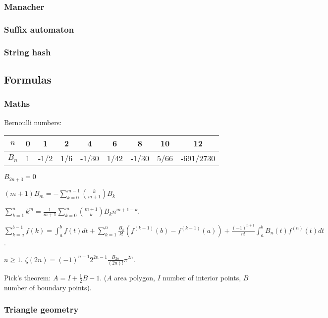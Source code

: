 \documentclass[a4paper, twocolumn, 10pt]{report}
\begin{document}
\subsubsection*{Manacher}

\subsubsection*{Suffix automaton}

\subsubsection*{String hash}


\newpage
\subsection*{Formulas}

\subsubsection*{Maths}
Bernoulli numbers: \begin{tabular}{|c|c|c|c|c|c|c|c|c|}
\hline
$n$ & 0 & 1 & 2 & 4 & 6 & 8 & 10 & 12\\
\hline
$B_n$ & 1 & -1/2 & 1/6 & -1/30 & 1/42 & -1/30 & 5/66 & -691/2730 \\
\hline
\end{tabular}

\medskip

\noindent $B_{2n+3} = 0$

\medskip

\noindent $(m+1) B_m = - \sum_{k=0}^{m-1}\binom{k}{m+1}B_k$

\medskip

\noindent $\sum_{k=1}^nk^m=\frac{1}{m+1}\sum_{k=0}^m\binom{m+1}{k}B_kn^{m+1-k}$.

\medskip

\noindent $\sum_{k=a}^{b-1}f(k)=\int_a^bf(t)dt+\sum_{k=1}^n\frac{B_k}{k!}\left(f^{(k-1)}(b)-f^{(k-1)}(a)\right)+\frac{(-1)^{n+1}}{n!}\int_a^bB_n(t)f^{(n)}(t)dt$.

\medskip

\noindent $n\geq 1$. $\zeta(2n)=(-1)^{n-1}2^{2n-1}\frac{B_{2n}}{(2n)!}\pi^{2n}$.

\noindent Pick's theorem: $A=I+\frac{1}{2}B-1$. ($A$ area polygon, $I$ number of interior points, $B$ number of boundary points).

\subsubsection*{Triangle geometry}
\end{document}
